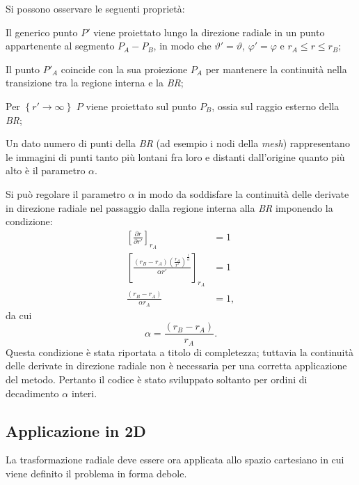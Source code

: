 Si possono osservare le seguenti proprietà:
\begin{aenumerate}
\item Il generico punto $P'$ viene proiettato lungo la direzione radiale in un punto appartenente al segmento $P_A-P_B$, in modo che $\vartheta' = \vartheta$, $\varphi' = \varphi$ e $r_A \leq r \leq r_B$;
\item Il punto $P'_A$ coincide con la sua proiezione $P_A$ per mantenere la continuità nella transizione tra la regione interna e la \textit{BR};
\item Per $\left\{r' \rightarrow \infty\right\}$  $P$ viene proiettato sul punto $P_B$, ossia sul raggio esterno della \textit{BR};
\item Un dato numero di punti della \textit{BR} (ad esempio i nodi della \textit{mesh}) rappresentano le immagini di punti tanto più lontani fra loro e distanti dall'origine quanto più alto è il parametro $\alpha$. 
\item Si può regolare il parametro $\alpha$ in modo da soddisfare la continuità delle derivate in direzione radiale nel passaggio dalla regione interna alla \textit{BR} imponendo la condizione:
\begin{align}
\label{eq:4derivata_continua}
\left[\frac{\partial r}{\partial r'}\right]_{r_A} &= 1\nonumber\\
\left[\frac{\left(r_B-r_A\right)\left(\frac{r_A}{r'}\right)^{\frac{1}{\alpha}}}{\alpha r'}\right]_{r_A} &= 1\nonumber\\
\frac{\left(r_B-r_A\right)}{\alpha r_A} &= 1,
\end{align}
da cui
\begin{equation}
\label{eq:4derivata_continua2}
\alpha = \frac{\left(r_B-r_A\right)}{r_A}.
\end{equation}
Questa condizione è stata riportata a titolo di completezza; tuttavia la continuità delle derivate in direzione radiale non è necessaria per una corretta applicazione del metodo. Pertanto il codice è stato sviluppato soltanto per ordini di decadimento $\alpha$ interi.
\end{aenumerate}

\subsection{Applicazione in 2D}

La trasformazione radiale deve essere ora applicata allo spazio cartesiano in cui viene definito il problema in forma debole.

